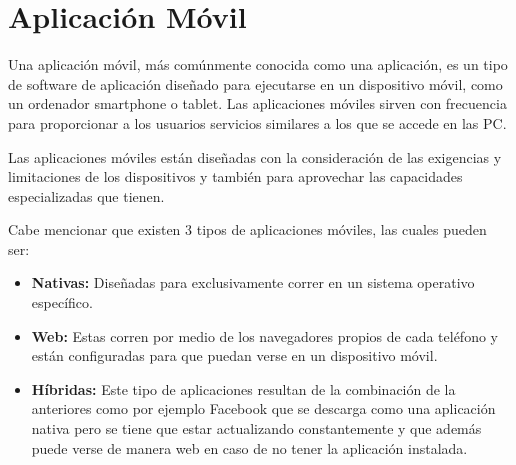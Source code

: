\section{Aplicación Móvil}

Una aplicación móvil, más comúnmente conocida como una aplicación, es un tipo de software de aplicación diseñado para ejecutarse en un dispositivo móvil, como un ordenador smartphone o tablet. Las aplicaciones móviles sirven con frecuencia para proporcionar a los usuarios servicios similares a los que se accede en las PC. \cite{queParaApps}

Las aplicaciones móviles están diseñadas con la consideración de las exigencias y limitaciones de los dispositivos y también para aprovechar las capacidades especializadas que tienen.

Cabe mencionar que existen 3 tipos de aplicaciones móviles, las cuales pueden ser: 

\begin{itemize}
	\item \textbf{Nativas: }Diseñadas para exclusivamente correr en un sistema operativo específico.
	\item \textbf{Web: }Estas corren por medio de los navegadores propios de cada teléfono y  están configuradas para que puedan verse en un dispositivo móvil.
	\item \textbf{Híbridas: }Este tipo de aplicaciones resultan de la combinación de la anteriores como por ejemplo Facebook  que se descarga como una aplicación nativa pero se tiene que estar actualizando constantemente y que además puede verse de manera web en caso de no tener la aplicación instalada.\cite{tiposApps}
\end{itemize}
